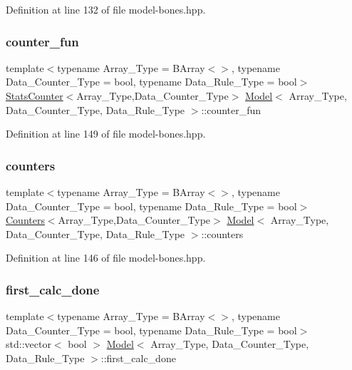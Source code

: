 Definition at line 132 of file model-\/bones.\+hpp.

\mbox{\label{class_model_a2bb5ec8af1a49bcb2da6c5f9f2374b15}} 
\subsubsection{\texorpdfstring{counter\+\_\+fun}{counter\_fun}}
{\footnotesize\ttfamily template$<$typename Array\+\_\+\+Type = B\+Array$<$$>$, typename Data\+\_\+\+Counter\+\_\+\+Type = bool, typename Data\+\_\+\+Rule\+\_\+\+Type = bool$>$ \\
\hyperlink{class_stats_counter}{Stats\+Counter}$<$Array\+\_\+\+Type,Data\+\_\+\+Counter\+\_\+\+Type$>$ \hyperlink{class_model}{Model}$<$ Array\+\_\+\+Type, Data\+\_\+\+Counter\+\_\+\+Type, Data\+\_\+\+Rule\+\_\+\+Type $>$\+::counter\+\_\+fun}



Definition at line 149 of file model-\/bones.\+hpp.

\mbox{\label{class_model_a3189eb46eed19f865ca0aa3f6b191c78}} 
\subsubsection{\texorpdfstring{counters}{counters}}
{\footnotesize\ttfamily template$<$typename Array\+\_\+\+Type = B\+Array$<$$>$, typename Data\+\_\+\+Counter\+\_\+\+Type = bool, typename Data\+\_\+\+Rule\+\_\+\+Type = bool$>$ \\
\hyperlink{class_counters}{Counters}$<$Array\+\_\+\+Type,Data\+\_\+\+Counter\+\_\+\+Type$>$ \hyperlink{class_model}{Model}$<$ Array\+\_\+\+Type, Data\+\_\+\+Counter\+\_\+\+Type, Data\+\_\+\+Rule\+\_\+\+Type $>$\+::counters}



Definition at line 146 of file model-\/bones.\+hpp.

\mbox{\label{class_model_a942b2cdb7472878fa17c5068680441c6}} 
\subsubsection{\texorpdfstring{first\+\_\+calc\+\_\+done}{first\_calc\_done}}
{\footnotesize\ttfamily template$<$typename Array\+\_\+\+Type = B\+Array$<$$>$, typename Data\+\_\+\+Counter\+\_\+\+Type = bool, typename Data\+\_\+\+Rule\+\_\+\+Type = bool$>$ \\
std\+::vector$<$ bool $>$ \hyperlink{class_model}{Model}$<$ Array\+\_\+\+Type, Data\+\_\+\+Counter\+\_\+\+Type, Data\+\_\+\+Rule\+\_\+\+Type $>$\+::first\+\_\+calc\+\_\+done}



